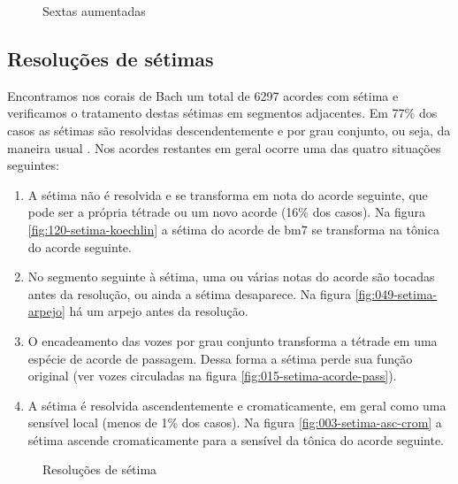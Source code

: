 \begin{figure}
  \centering
  \caption{Sextas aumentadas}
  \label{fig:sextas-aumentadas}
\end{figure}

\subsection{Resoluções de sétimas}
\label{sec:setimas}

Encontramos nos corais de Bach um total de 6297 acordes com sétima e
verificamos o tratamento destas sétimas em segmentos adjacentes. Em
77\% dos casos as sétimas são resolvidas descendentemente e por grau
conjunto, ou seja, da maneira usual \cite[p. 207]{kostka.ea00:tonal}.
Nos acordes restantes em geral ocorre uma das quatro situações
seguintes:

\begin{enumerate}
\item A sétima não é resolvida e se transforma em nota do acorde
  seguinte, que pode ser a própria tétrade ou um novo acorde (16\% dos
  casos). Na figura \ref{fig:120-setima-koechlin} a sétima do acorde
  de bm7 se transforma na tônica do acorde seguinte.
\item No segmento seguinte à sétima, uma ou várias notas do acorde são
  tocadas antes da resolução, ou ainda a sétima desaparece. Na figura
  \ref{fig:049-setima-arpejo} há um arpejo antes da resolução.
\item O encadeamento das vozes por grau conjunto transforma a tétrade
  em uma espécie de acorde de passagem. Dessa forma a sétima perde sua
  função original (ver vozes circuladas na figura
  \ref{fig:015-setima-acorde-pass}).
\item A sétima é resolvida ascendentemente e cromaticamente, em geral
  como uma sensível local (menos de 1\% dos casos). Na figura
  \ref{fig:003-setima-asc-crom} a sétima ascende cromaticamente para a
  sensível da tônica do acorde seguinte.
\end{enumerate}

\begin{figure}
  \centering
  \caption{Resoluções de sétima}
  \label{fig:setima-resol}
\end{figure}

